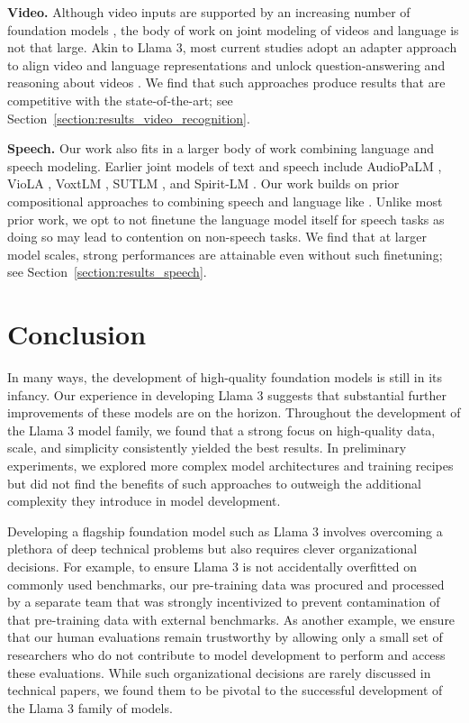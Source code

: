 \textbf{Video.}
Although video inputs are supported by an increasing number of foundation models \citep{gemini2023gemini,openai2023gpt4blog}, the body of work on joint modeling of videos and language is not that large. Akin to Llama 3, most current studies adopt an adapter approach to align video and language representations and unlock question-answering and reasoning about videos \citep{lin2023video,li2023videochat,Maaz2023VideoChatGPT,zhang2023videollama,zhao2022lavila}. We find that such approaches produce results that are competitive with the state-of-the-art; see Section~\ref{section:results_video_recognition}.

\textbf{Speech.}
Our work also fits in a larger body of work combining language and speech modeling. Earlier joint models of text and speech include AudioPaLM \citep{rubenstein2023audiopalm}, VioLA \citep{wang2023viola}, VoxtLM \cite{maiti2023voxtlm}, SUTLM \citep{chou2023sutlm}, and Spirit-LM \citep{nguyen2024spirit}. Our work builds on prior compositional approaches to combining speech and language like \citet{fathullah2024audiochatllama}.
Unlike most prior work, we opt to not finetune the language model itself for speech tasks as doing so may lead to contention on non-speech tasks. We find that at larger model scales, strong performances are attainable even without such finetuning; see Section~\ref{section:results_speech}.

\section{Conclusion}
\label{section:conclusion}
In many ways, the development of high-quality foundation models is still in its infancy. Our experience in developing Llama 3 suggests that substantial further improvements of these models are on the horizon. Throughout the development of the Llama 3 model family, we found that a strong focus on high-quality data, scale, and simplicity consistently yielded the best results. In preliminary experiments, we explored more complex model architectures and training recipes but did not find the benefits of such approaches to outweigh the additional complexity they introduce in model development.

Developing a flagship foundation model such as Llama 3 involves overcoming a plethora of deep technical problems but also requires clever organizational decisions. For example, to ensure Llama 3 is not accidentally overfitted on commonly used benchmarks, our pre-training data was procured and processed by a separate team that was strongly incentivized to prevent contamination of that pre-training data with external benchmarks. As another example, we ensure that our human evaluations remain trustworthy by allowing only a small set of researchers who do not contribute to model development to perform and access these evaluations. While such organizational decisions are rarely discussed in technical papers, we found them to be pivotal to the successful development of the Llama 3 family of models.

